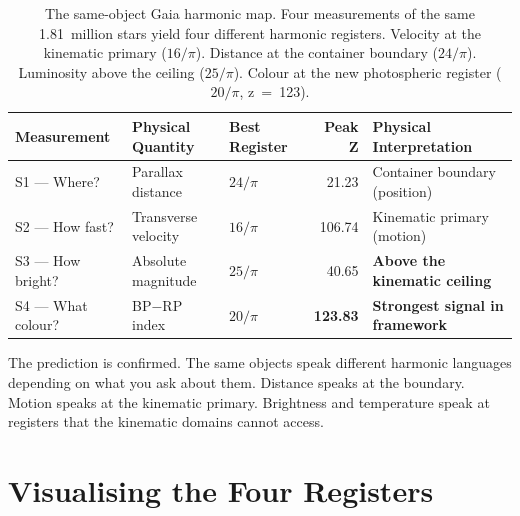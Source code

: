 \documentclass[11pt, letterpaper, openany]{book}
\begin{document}
\begin{table}[H]
\centering
\renewcommand{\arraystretch}{1.6}
\begin{tabular}{|l|l|l|r|l|}
\hline
\rowcolor{kishblue!10}
\textbf{Measurement} & \textbf{Physical Quantity} & \textbf{Best Register} & \textbf{Peak Z} & \textbf{Physical Interpretation} \\
\hline\hline
\rowcolor{signalgreen!8}
S1 --- Where?    & Parallax distance & $24/\pi$ & 21.23 & Container boundary (position) \\
\rowcolor{kishblue!12}
S2 --- How fast? & Transverse velocity & $16/\pi$ & 106.74 & Kinematic primary (motion) \\
\rowcolor{luminorange!10}
S3 --- How bright? & Absolute magnitude & $25/\pi$ & 40.65 & \textbf{Above the kinematic ceiling} \\
\rowcolor{colourgold!15}
S4 --- What colour? & BP$-$RP index & $20/\pi$ & \textbf{123.83} & \textbf{Strongest signal in framework} \\
\hline
\end{tabular}
\caption{The same-object Gaia harmonic map. Four measurements of the same
1.81~million stars yield four different harmonic registers. Velocity at the kinematic
primary ($16/\pi$). Distance at the container boundary ($24/\pi$). Luminosity above
the ceiling ($25/\pi$). Colour at the new photospheric register ($20/\pi$, z~=~123).}
\label{tab:gaia_harmonic_map}
\end{table}

The prediction is confirmed. The same objects speak different harmonic languages
depending on what you ask about them. Distance speaks at the boundary. Motion speaks
at the kinematic primary. Brightness and temperature speak at registers that the
kinematic domains cannot access.

\section{Visualising the Four Registers}
\end{document}
